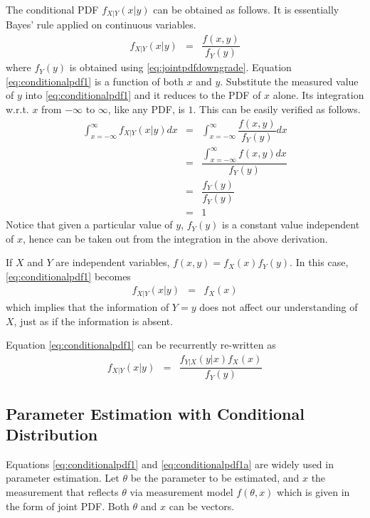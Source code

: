 The conditional PDF $f_{X|Y}(x|y)$ can be obtained as follows. It is essentially Bayes' rule applied on continuous variables.
\begin{eqnarray}
  f_{X|Y}(x|y) &=& \dfrac{f(x, y)}{f_Y(y)} \label{eq:conditionalpdf1}
\end{eqnarray}
where $f_Y(y)$ is obtained using \eqref{eq:jointpdfdowngrade}. Equation \eqref{eq:conditionalpdf1} is a function of both $x$ and $y$. Substitute the measured value of $y$ into \eqref{eq:conditionalpdf1} and it reduces to the PDF of $x$ alone. Its integration w.r.t. $x$ from $-\infty$ to $\infty$, like any PDF, is $1$. This can be easily verified as follows.
\begin{eqnarray}
  \int_{x=-\infty}^{\infty}f_{X|Y}(x|y)dx &=& \int_{x=-\infty}^{\infty}\dfrac{f(x, y)}{f_Y(y)}dx \nonumber \\
  &=& \dfrac{\int_{x=-\infty}^{\infty}f(x, y)dx}{f_Y(y)} \nonumber \\
  &=& \dfrac{f_Y(y)}{f_Y(y)} \nonumber \\
  &=& 1 \nonumber
\end{eqnarray}
Notice that given a particular value of $y$, $f_Y(y)$ is a constant value independent of $x$, hence can be taken out from the integration in the above derivation.

If $X$ and $Y$ are independent variables, $f(x,y) = f_X(x)f_Y(y)$. In this case, \eqref{eq:conditionalpdf1} becomes
\begin{eqnarray}
  f_{X|Y}(x|y) &=& f_X(x) \nonumber
\end{eqnarray}
which implies that the information of $Y=y$ does not affect our understanding of $X$, just as if the information is absent.

Equation \eqref{eq:conditionalpdf1} can be recurrently re-written as
\begin{eqnarray}
f_{X|Y}(x|y) &=& \dfrac{f_{Y|X}(y|x)f_X(x)}{f_Y(y)} \label{eq:conditionalpdf1a}
\end{eqnarray}

\subsection{Parameter Estimation with Conditional Distribution}

Equations \eqref{eq:conditionalpdf1} and \eqref{eq:conditionalpdf1a} are widely used in parameter estimation. Let $\theta$ be the parameter to be estimated, and $x$ the measurement that reflects $\theta$ via measurement model $f(\theta, x)$ which is given in the form of joint PDF. Both $\theta$ and $x$ can be vectors.


